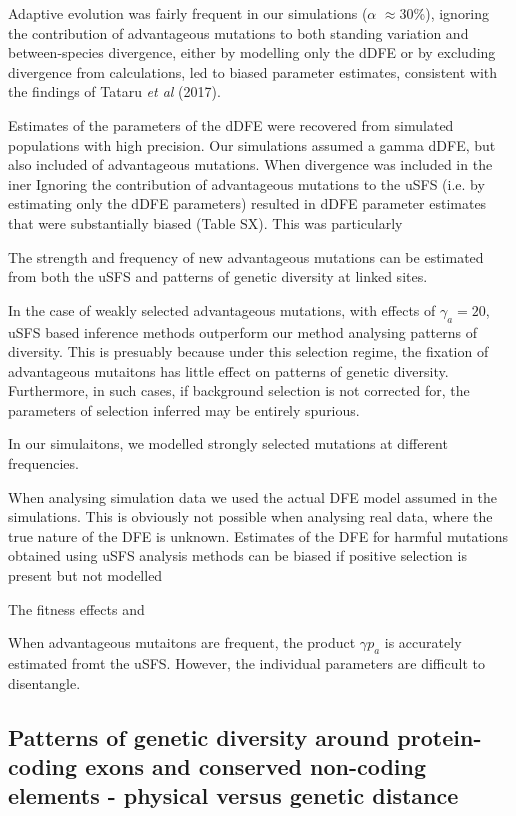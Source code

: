 \documentclass[11pt]{article}
\begin{document}
		Adaptive evolution was fairly frequent in our simulations ($\alpha$ $\approx30$\%), 
	ignoring the contribution of advantageous mutations to both standing variation and between-species divergence, either by modelling only the dDFE or by excluding divergence from calculations, led to biased parameter estimates, consistent with the findings of Tataru \textit{et al} (2017). 
	
	Estimates of the parameters of the dDFE were recovered from simulated populations with high precision. Our simulations assumed a gamma dDFE, but also included of advantageous mutations. When divergence was included in the iner
	Ignoring the contribution of advantageous mutations to the uSFS (i.e. by estimating only the dDFE parameters) resulted in dDFE parameter estimates that were substantially biased (Table SX). This was particularly 
	


	The strength and frequency of new advantageous mutations can be  estimated from both the uSFS and patterns of genetic diversity at linked sites. 
	
	
	
	
	In the case of weakly selected advantageous mutations, with effects of $\gamma_a = 20$, uSFS based inference methods outperform our method analysing patterns of diversity. This is presuably because under this selection regime, the fixation of advantageous mutaitons has little effect on patterns of genetic diversity. Furthermore, in such cases, if background selection is not corrected for, the parameters of selection inferred may be entirely spurious.
	
	In our simulaitons, we modelled strongly selected mutations at different frequencies. 
	
	When analysing simulation data we used the actual DFE model assumed in the simulations. This is obviously not possible when analysing real data, where the true nature of the DFE is unknown. Estimates of the DFE for harmful mutations obtained using uSFS analysis methods can be biased if positive selection is present but not modelled 
	
The fitness effects and 

When advantageous mutaitons are frequent, the product $\gamma p_a$ is accurately estimated fromt the uSFS. However, the individual parameters are difficult to disentangle. 
	

\subsection*{Patterns of genetic diversity around protein-coding exons and conserved non-coding elements - physical versus genetic distance}
\end{document}
